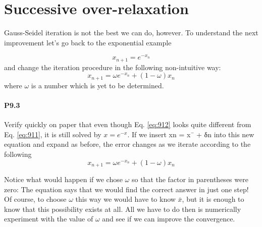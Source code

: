 \section*{Successive over-relaxation}
Gauss-Seidel iteration is not the best we can do, however. To understand the next
improvement let\rq s go back to the exponential example

\begin{equation}\label{eq:911}
x_{n+1}=e^{-x_{n}}
\end{equation}
and change the iteration procedure in the following non-intuitive way:
\begin{equation}\label{eq:912}
x_{n+1}=\omega e^{-x_{n}}+(1-\omega) x_{n}
\end{equation}
where $\omega$ is a number which is yet to be determined.
\paragraph*{P9.3} Verify quickly on paper that even though Eq. \eqref{eq:912} looks quite different
from Eq. \eqref{eq:911}, it is still solved by $x = e^{-x}$.
If we insert xn = x¯ + δn into this new equation and expand as before, the error
changes as we iterate according to the following
\begin{equation}\label{eq:913}
x_{n+1}=\omega e^{-x_{n}}+(1-\omega) x_{n}
\end{equation}

Notice what would happen if we chose $\omega$ so that the factor in parentheses were
zero: The equation says that we would find the correct answer in just one step! Of
course, to choose $\omega$ this way we would have to know $\bar{x}$, but it is enough to know
that this possibility exists at all. All we have to do then is numerically experiment
with the value of $\omega$ and see if we can improve the convergence.

